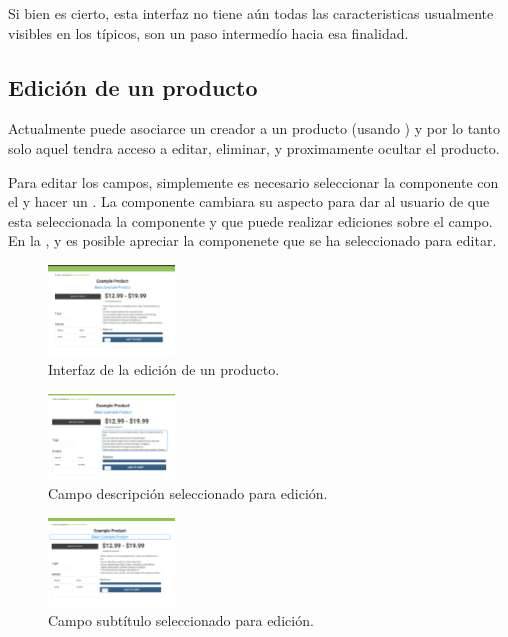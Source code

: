 Si bien es cierto, esta interfaz no tiene aún todas las caracteristicas usualmente visibles en los \websitesINT \ecommerceCOM típicos, son un paso intermedío hacia esa finalidad.

 \subsection{Edición de un producto}

Actualmente puede asociarce un creador a un producto (usando \fixturesPC) y por lo tanto solo aquel tendra acceso a editar, eliminar, y proximamente ocultar el producto.

Para editar los campos, simplemente es necesario seleccionar la componente con el \mouse y hacer un \click. La componente cambiara su aspecto para dar \feedback al usuario de que esta seleccionada la componente y que puede realizar ediciones sobre el campo. En la ,  y  es posible apreciar la componenete que se ha seleccionado para editar.

\begin{figure}[H]
	\centering
	\includegraphics[width=0.3\textwidth]{figuras/productos/interfaz_edicion_producto.png}

	\caption{Interfaz de la edición de un producto.}
	\label{figure:features:interfaz_edicion_producto}
\end{figure}

\begin{figure}[H]
	\centering
	\includegraphics[width=0.3\textwidth]{figuras/productos/interfaz_edicion_editando_description.png}

	\caption{Campo descripción seleccionado para edición.}
	\label{figure:features:interfaz_edicion_editando_description}
\end{figure}


\begin{figure}[H]
	\centering
	\includegraphics[width=0.3\textwidth]{figuras/productos/interfaz_edicion_editando_subtitulo.png}

	\caption{Campo subtítulo seleccionado para edición.}
	\label{figure:features:interfaz_edicion_editando_subtitulo}
\end{figure}

